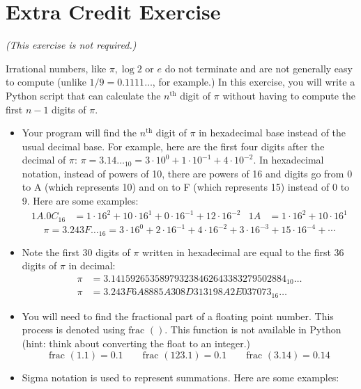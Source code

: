 \documentclass[11pt]{cselabheader}
\begin{document}
{\vspace{5em}
\section{Extra Credit Exercise}
\begin{center}
\textit{(This exercise is not required.)}
\end{center}

Irrational numbers, like $\pi, \log 2$ or $e$ do not terminate and are not generally easy to compute (unlike $1/9 = 0.1111\dots$, for example.)
In this exercise, you will write a Python script that can calculate the $n^\text{th}$ digit of $\pi$ without having to compute the first $n-1$ digits of $\pi$.

\begin{itemize}
\item Your program will find the $n^\text{th}$ digit of $\pi$ in hexadecimal base instead of the usual decimal base. For example, here are the first four digits after the decimal of $\pi$: $\pi = 3.14\dots_{10} = 3 \cdot 10^0 + 1 \cdot 10^{-1} + 4 \cdot 10^{-2}$.
In hexadecimal notation, instead of powers of 10, there are powers of 16 and digits go from 0 to A (which represents 10) and on to F (which represents 15) instead of 0 to 9. Here are some examples:
\begin{align*}
1A.0C_{16} &= 1 \cdot {16^2} + 10 \cdot 16^1 + 0 \cdot 16^{-1} + 12 \cdot 16^{-2}
&
1A &= 1 \cdot {16^2} + 10 \cdot 16^1
\end{align*}
\vspace{-1.5em}
$$\pi = 3.243F\dots_{16} = 3 \cdot 16^0 + 2 \cdot 16^{-1} + 4 \cdot 16^{-2} + 3 \cdot 16^{-3}
      + 15 \cdot 16^{-4} + \cdots
$$

\item Note the first 30 digits of $\pi$ written in hexadecimal are equal to the first 36 digits of $\pi$ in decimal:
\begin{align*}
\pi &= 3.141592653589793238462643383279502884_{10}\dots
\\
\pi &= 3.243F6A8885A308D313198A2E037073_{16}\dots
\end{align*}

\item You will need to find the fractional part of a floating point number. This
process is denoted using $\text{frac }()$. This function is not available in Python
(hint: think about converting the float to an integer.)
$$\text{frac }(1.1) = 0.1 \qquad \text{frac }(123.1) = 0.1 \qquad \text{frac }(3.14) = 0.14$$
\item Sigma notation is used to represent summations.
Here are some examples:


\end{itemize}}
\end{document}
